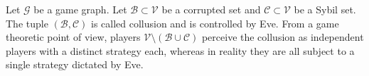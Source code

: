 {}
\begin{definition}[Collusion]
  Let $\mathcal{G}$ be a game graph. Let $\mathcal{B} \subset \mathcal{V}$ be a corrupted set and $\mathcal{C} \subset
  \mathcal{V}$ be a Sybil set. The tuple $\left(\mathcal{B}, \mathcal{C}\right)$ is called collusion and is controlled by Eve.
  From a game theoretic point of view, players $\mathcal{V} \setminus (\mathcal{B} \cup \mathcal{C})$ perceive the collusion
  as independent players with a distinct strategy each, whereas in reality they are all subject to a single strategy dictated
  by Eve.
\end{definition}
